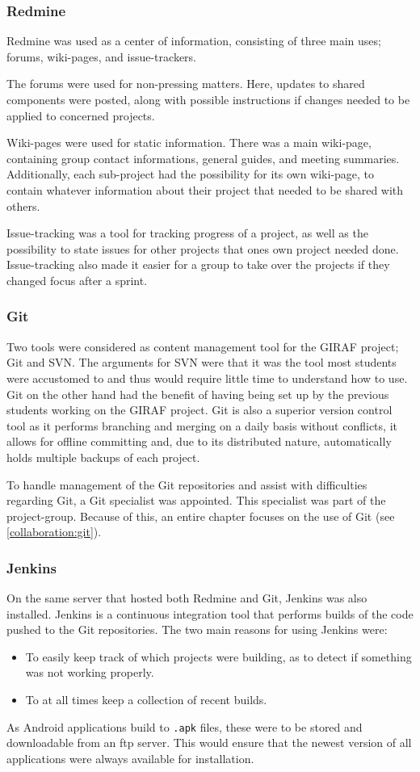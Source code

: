 \subsubsection{Redmine}
Redmine was used as a center of information, consisting of three main uses; forums, wiki-pages, and issue-trackers.

The forums were used for non-pressing matters.
Here, updates to shared components were posted, along with possible instructions if changes needed to be applied to concerned projects.

Wiki-pages were used for static information.
There was a main wiki-page, containing group contact informations, general guides, and meeting summaries.
Additionally, each sub-project had the possibility for its own wiki-page, to contain whatever information about their project that needed to be shared with others.

Issue-tracking was a tool for tracking progress of a project, as well as the possibility to state issues for other projects that ones own project needed done.
Issue-tracking also made it easier for a group to take over the projects if they changed focus after a sprint.

\subsubsection{Git}
Two tools were considered as content management tool for the GIRAF project; Git and SVN.
The arguments for SVN were that it was the tool most students were accustomed to and thus would require little time to understand how to use.
Git on the other hand had the benefit of having being set up by the previous students working on the GIRAF project.
Git is also a superior version control tool as it performs branching and merging on a daily basis without conflicts, it allows for offline committing and, due to its distributed nature, automatically holds multiple backups of each project.

To handle management of the Git repositories and assist with difficulties regarding Git, a Git specialist was appointed.
This specialist was part of the project-group.
Because of this, an entire chapter focuses on the use of Git (see \cref{collaboration:git}).

\subsubsection{Jenkins}
On the same server that hosted both Redmine and Git, Jenkins was also installed.
Jenkins is a continuous integration tool that performs builds of the code pushed to the Git repositories.
The two main reasons for using Jenkins were:
\begin{itemize}
\item To easily keep track of which projects were building, as to detect if something was not working properly.
\item To at all times keep a collection of recent builds.
\end{itemize}
As Android applications build to \texttt{.apk} files, these were to be stored and downloadable from an ftp server.
This would ensure that the newest version of all applications were always available for installation.

